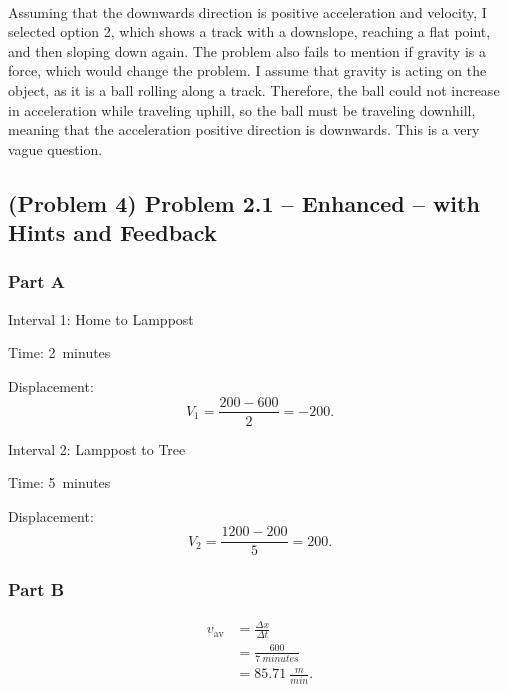 ~

\begin{solution}
	Assuming that the downwards direction is positive acceleration and velocity, I selected option 2, which shows a track with a downslope, reaching a flat point, and then sloping down again. The problem also fails to mention if gravity is a force, which would change the problem. I assume that gravity is acting on the object, as it is a ball rolling along a track. Therefore, the ball could not increase in acceleration while traveling uphill, so the ball must be traveling downhill, meaning that the acceleration positive direction is downwards. This is a very vague question.
\end{solution}

\newpage

\subsection{(Problem 4) Problem 2.1 -- Enhanced -- with Hints and Feedback}

\subsubsection{Part A}

\begin{solution}

	Interval 1: Home to Lamppost

	Time: \SI{2}{minutes}

	Displacement:
	\[
		V_1 = \frac{200 - 600}{2} = -200
		.\]

	Interval 2: Lamppost to Tree

	Time: \SI{5}{minutes}

	Displacement:
	\[
		V_2 = \frac{1200 - 200}{5} = 200
		.\]
\end{solution}

\subsubsection{Part B}

\begin{solution}
	\begin{align*}
		v_{\mathrm{av}} &= \frac{\Delta x}{\Delta t} \\
		&= \frac{600}{\SI{7}{minutes}} \\
		&= \SI{85.71}{\frac{m}{min}}
		.\end{align*}
\end{solution}

